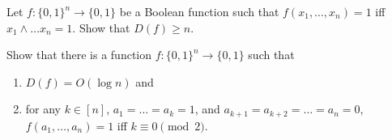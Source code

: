 \documentclass[addpoints,answers]{exam}
\begin{document}
    \pagestyle{headandfoot}
    \runningheadrule

    \firstpagefooter{}{}{}
    \runningfooter{}{}{}
    \begin{flushright}

        \vspace{0.2in}

    \end{flushright}

    \begin{questions}
        \question[10]
            Let $f : \{0, 1\}^n \to \{0, 1\}$ be a Boolean function such that
            $f(x_1, \dots, x_n) = 1$ iff $x_1 \land \dots x_n = 1$.
            Show that $D(f) \ge n$.
            \begin{solutionorbox}[\stretch{1}]
            \end{solutionorbox}
            \newpage
        \question[10]
            Show that there is a function $f : \{0, 1\}^n \to \{0, 1\}$ such that
            \begin{enumerate}
              \item $D(f) = O(\log n)$ and
              \item for any $k \in [n]$, $a_1 = \dots = a_k = 1$, and
                $a_{k + 1} = a_{k + 2} = \dots = a_n = 0$, $f(a_1, \dots, a_n) = 1$ iff $k \equiv 0 \pmod{2}$.
            \end{enumerate}
            \begin{solutionorbox}[\stretch{1}]
            \end{solutionorbox}
            \newpage
\end{questions}
\end{document}

